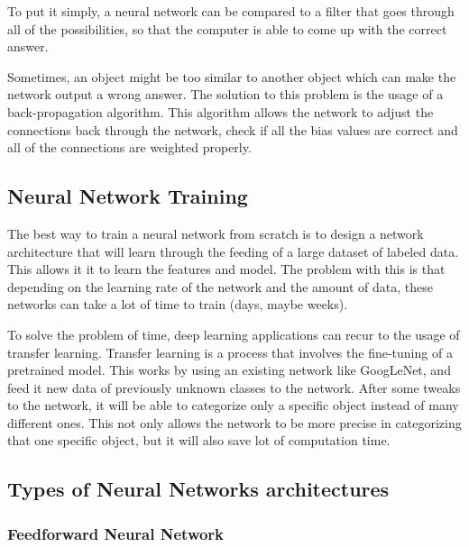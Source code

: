     
   
    \par To put it simply, a neural network can be compared to a filter that goes through all of the possibilities, so that the computer is able to come up with the correct answer.
    \par Sometimes, an object might be too similar to another object which can make the network output a wrong answer. The solution to this problem is the usage of a back-propagation algorithm. This algorithm allows the network to adjust the connections back through the network, check if all the bias values are correct and all of the connections are weighted properly. \cite{ArmaanMerchant2018}
    


        \subsection{Neural Network Training}

        \par The best way to train a neural network from scratch is to design a network architecture that will learn through the feeding of a large dataset of labeled data. This allows it it to learn the features and model. The problem with this is that depending on the learning rate of the network and the amount of data, these networks can take a lot of time to train (days, maybe weeks). 

        \par To solve the problem of time, deep learning applications can recur to the usage of transfer learning. Transfer learning is a process that involves the fine-tuning of a pretrained model. This works by using an existing network like GoogLeNet, and feed it new data of previously unknown classes to the network. After some tweaks to the network, it will be able to categorize only a specific object instead of many different ones. This not only allows the network to be more precise in categorizing that one specific object, but it will also save lot of computation time.  \cite{mathworks_deeplearning}

        
        \subsection{Types of Neural Networks architectures}

            \subsubsection{Feedforward Neural Network}
            
